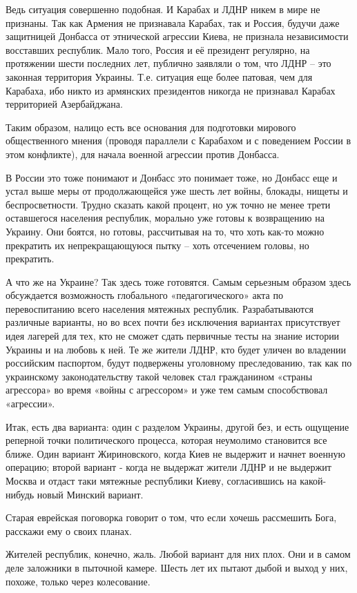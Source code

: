 Ведь ситуация совершенно подобная. И Карабах и ЛДНР никем в мире не признаны.
Так как Армения не признавала Карабах, так и Россия, будучи даже защитницей
Донбасса от этнической агрессии Киева, не признала независимости восставших
республик. Мало того, Россия и её президент регулярно, на протяжении шести
последних лет, публично заявляли о том, что ЛДНР – это законная территория
Украины. Т.е. ситуация еще более патовая, чем для Карабаха, ибо никто из
армянских президентов никогда не признавал Карабах территорией Азербайджана. 

Таким образом, налицо есть все основания для подготовки мирового общественного
мнения (проводя параллели с Карабахом и с поведением России в этом конфликте),
для начала военной агрессии против Донбасса.

В России это тоже понимают и Донбасс это понимает тоже, но Донбасс еще и устал
выше меры от продолжающейся уже шесть лет войны, блокады, нищеты и
беспросветности. Трудно сказать какой процент, но уж точно не менее трети
оставшегося населения республик, морально уже готовы к возвращению на Украину.
Они боятся, но готовы, рассчитывая на то, что хоть как-то можно прекратить их
непрекращающуюся пытку – хоть отсечением головы, но прекратить. 

А что же на Украине? Так здесь тоже готовятся. Самым серьезным образом здесь
обсуждается возможность глобального «педагогического» акта по перевоспитанию
всего населения мятежных республик. Разрабатываются различные варианты, но во
всех почти без исключения вариантах присутствует идея лагерей для тех, кто не
сможет сдать первичные тесты на знание истории Украины и на любовь к ней. Те же
жители ЛДНР, кто будет уличен во владении российским паспортом, будут
подвержены уголовному преследованию, так как по украинскому законодательству
такой человек стал гражданином «страны агрессора» во время «войны с агрессором»
и уже тем самым способствовал «агрессии». 

Итак, есть два варианта: один с разделом Украины, другой без, и есть ощущение
реперной точки политического процесса, которая неумолимо становится все ближе.
Один вариант Жириновского, когда Киев не выдержит и начнет военную операцию;
второй вариант - когда не выдержат жители ЛДНР и не выдержит Москва и отдаст
таки мятежные республики Киеву, согласившись на какой-нибудь новый Минский
вариант.

Старая еврейская поговорка говорит о том, что если хочешь рассмешить Бога,
расскажи ему о своих планах. 

Жителей республик, конечно, жаль. Любой вариант для них плох. Они и в самом
деле заложники в пыточной камере. Шесть лет их пытают дыбой и выход у них,
похоже, только через колесование.
